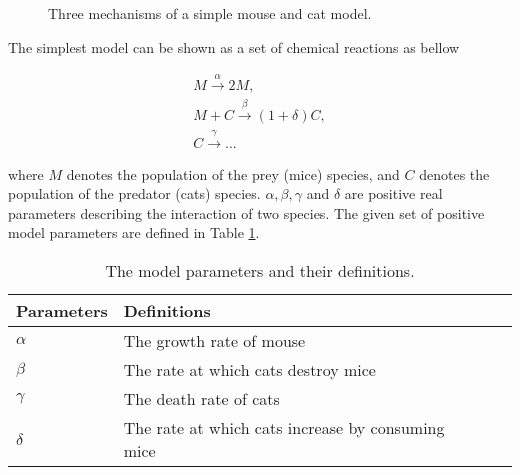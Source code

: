 \documentclass[a4paper,12pt]{article}
\begin{document}
\begin{figure}[ht]         
      \begin{center}    
    \end{center}     
\caption {Three mechanisms of a simple mouse and cat model.}  
   \label{f1}  
\end{figure}
The simplest model can be shown as a set of chemical reactions as bellow
\begin{center} 
\begin{equation} 
\begin{array}{llll}  
M {\overset{\alpha}\longrightarrow } 2M, \\
M+C {\overset{\beta}\longrightarrow } (1+\delta)C, \\ 
C{\overset{\gamma}\longrightarrow }...
\end{array}
\label{eqy} 
 \end{equation}     
 \end{center} 
\noindent where $M$ denotes the population of the prey (mice) species, and $C$ denotes
the population of the predator (cats) species. $\alpha, \beta, \gamma$ and $\delta$ are positive real parameters describing the interaction of two species. The given set of positive model parameters are defined in Table \ref{table1}.
\begin{table}   
  \center
  \begin{tabular}{ | l  | l | l | l |  }
    \hline
     \textbf {Parameters} & \textbf {Definitions}   \\ \hline      
     $\alpha$ &  The growth rate of mouse    \\ \hline
     $\beta$ &  The rate at which cats destroy mice     \\ \hline
      $\gamma$& The death rate of cats    \\ \hline
    $\delta$&  The rate at which cats increase by consuming mice     \\ \hline       
    \end{tabular}
    \caption{The model parameters and their definitions.}
    \label{table1}   
\end{table}   
\end{document}
